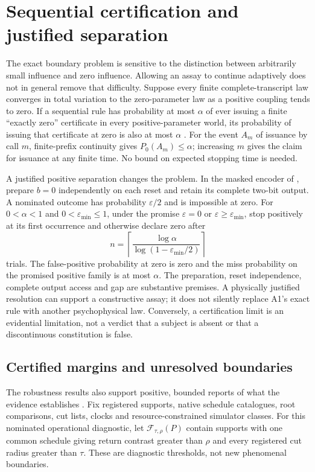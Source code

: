 \section{Sequential certification and justified separation}\label{sec:sequential-certification-update}
The exact boundary problem is sensitive to the distinction between arbitrarily small influence and zero influence. Allowing an assay to continue adaptively does not in general remove that difficulty. Suppose every finite complete-transcript law converges in total variation to the zero-parameter law as a positive coupling tends to zero. If a sequential rule has probability at most $\alpha$ of ever issuing a finite ``exactly zero'' certificate in every positive-parameter world, its probability of issuing that certificate at zero is also at most $\alpha$ \cite{RodgersIntegration2026}. For the event $A_m$ of issuance by call $m$, finite-prefix continuity gives $P_0(A_m)\le\alpha$; increasing $m$ gives the claim for issuance at any finite time. No bound on expected stopping time is needed.

A justified positive separation changes the problem. In the masked encoder of \cite{RodgersBoundaries2026}, prepare $b=0$ independently on each reset and retain its complete two-bit output. A nominated outcome has probability $\varepsilon/2$ and is impossible at zero. For $0<\alpha<1$ and $0<\varepsilon_{\min}\le1$, under the promise $\varepsilon=0$ or $\varepsilon\ge\varepsilon_{\min}$, stop positively at its first occurrence and otherwise declare zero after
\[
n=\left\lceil\frac{\log\alpha}{\log(1-\varepsilon_{\min}/2)}\right\rceil
\]
trials. The false-positive probability at zero is zero and the miss probability on the promised positive family is at most $\alpha$. The preparation, reset independence, complete output access and gap are substantive premises. A physically justified resolution can support a constructive assay; it does not silently replace A1's exact rule with another psychophysical law. Conversely, a certification limit is an evidential limitation, not a verdict that a subject is absent or that a discontinuous constitution is false.

\subsection{Certified margins and unresolved boundaries}
\label{sec:boundary-evidence-intervals}
The robustness results also support positive, bounded reports of what the evidence establishes \cite[Section~7]{RodgersBoundaries2026}. Fix registered supports, native schedule catalogues, root comparisons, cut lists, clocks and resource-constrained simulator classes. For this nominated operational diagnostic, let $\mathcal F_{\tau,\rho}(P)$ contain supports with one common schedule giving return contrast greater than $\rho$ and every registered cut radius greater than $\tau$. These are diagnostic thresholds, not new phenomenal boundaries.

